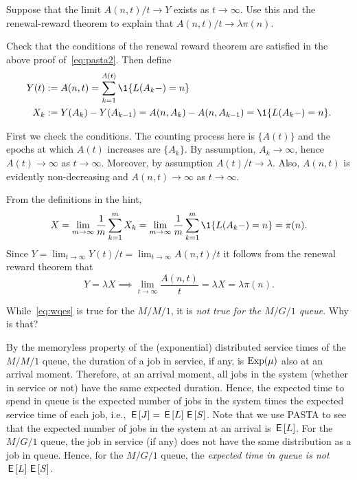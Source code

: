 \documentclass[queueing-book.tex]{subfiles}
\begin{document}
\begin{exercise}\label{ex:18}
Suppose that the limit $A(n,t)/t \to Y$ exists as $t\to \infty$. Use this and  the renewal-reward theorem to explain that $A(n,t)/t \to \lambda \pi(n)$.
\begin{hint}
Check that the conditions of the renewal reward theorem are satisfied in the above proof of~\cref{eq:pasta2}. Then define
\begin{align*}
 Y(t) &:= A(n,t) = \sum_{k=1}^{A(t)} \1{\L(A_k-) = n} \\
X_k &:= Y(A_k) - Y(A_{k-1}) = A(n, A_k) - A(n, A_{k-1}) = \1{\L(A_k-)=n}.
\end{align*}

\end{hint}
\begin{solution}
First we check the conditions. The counting process here is $\{A(t)\}$ and the epochs at which
 $A(t)$ increases are $\{A_k\}$. By assumption, $A_k\to\infty$,
 hence $A(t)\to\infty$ as $t\to\infty$. Moreover, by assumption
 $A(t)/t \to \lambda$. Also, $A(n,t)$ is evidently non-decreasing and
 $A(n,t)\to\infty$ as $t\to\infty$.


From the definitions in the hint,
\begin{equation*}
X= \lim_{m\to\infty} \frac 1 m \sum_{k=1}^m X_k =\lim_{m\to\infty} \frac 1 m \sum_{k=1}^m \1{\L(A_k-)=n} = \pi(n).
\end{equation*}
Since $Y=\lim_{t\to\infty} Y(t)/t = \lim_{t\to\infty} A(n,t)/t$ it follows from the renewal reward theorem that
\begin{equation*}
 Y=\lambda X \implies \lim_{t\to\infty} \frac{A(n,t)} t = \lambda X = \lambda \pi(n).
\end{equation*}
\end{solution}
\end{exercise}



\begin{exercise}\label{ex:l-216}
While~\cref{eq:wqes} is true for the $M/M/1$, it is \emph{not true for the $M/G/1$ queue}. Why is that?
\begin{solution}
 By the memoryless property of the (exponential) distributed service times of the $M/M/1$ queue, the duration of a job in service, if any, is $\mathrm{Exp}(\mu)$ also at an arrival moment.
 Therefore, at an arrival moment, all jobs in the system (whether in service or not) have the same expected duration.
 Hence, the expected time to spend in queue is the expected number of jobs in the system times the expected service time of each job, i.e., $\,\mathsf{E}\left[J\right] = \,\mathsf{E}\left[L\right] \,\mathsf{E}\left[S\right]$.
 Note that we use PASTA to see that the expected number of jobs in the system at an arrival is $\,\mathsf{E}\left[L\right]$.
 For the $M/G/1$ queue, the job in service (if any) does not have the same distribution as a job in queue.
 Hence, for the $M/G/1$ queue, the \emph{expected time in queue is not} $\,\mathsf{E}\left[L\right] \,\mathsf{E}\left[S\right]$.
\end{solution}
\end{exercise}



\end{document}
